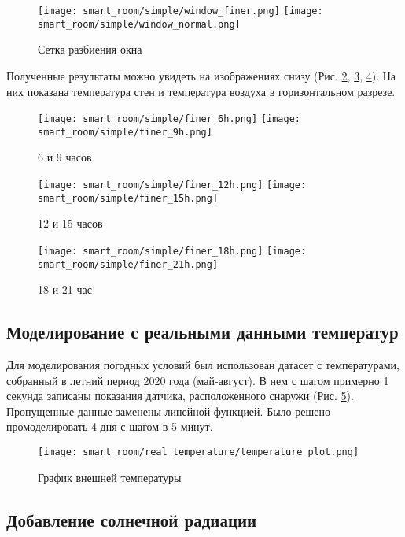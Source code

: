\begin{figure}[H]
\texttt{[image: smart\_room/simple/window\_finer.png]}\hfill
\texttt{[image: smart\_room/simple/window\_normal.png]}
\caption{Сетка разбиения окна}
\label{window}
\end{figure}


Полученные результаты можно увидеть на изображениях снизу (Рис. \ref{6-9}, \ref{12-15}, \ref{18-21}). На них показана температура стен и температура воздуха в горизонтальном разрезе.

\begin{figure}[H]
\texttt{[image: smart\_room/simple/finer\_6h.png]}\hfill
\texttt{[image: smart\_room/simple/finer\_9h.png]}
\caption{6 и 9 часов}
\label{6-9}
\end{figure}

\begin{figure}[H]
\texttt{[image: smart\_room/simple/finer\_12h.png]}\hfill
\texttt{[image: smart\_room/simple/finer\_15h.png]}
\caption{12 и 15 часов}
\label{12-15}
\end{figure}

\begin{figure}[H]
\texttt{[image: smart\_room/simple/finer\_18h.png]}\hfill
\texttt{[image: smart\_room/simple/finer\_21h.png]}
\caption{18 и 21 час}
\label{18-21}
\end{figure}
\newpage


\subsection{Моделирование с реальными данными температур}

Для моделирования погодных условий был использован датасет с температурами, собранный в летний период 2020 года (май-август). В нем с шагом примерно 1 секунда записаны показания датчика, расположенного снаружи (Рис. \ref{real-temperature-plot}). Пропущенные данные заменены линейной функцией. Было решено промоделировать 4 дня с шагом в 5 минут. 

\begin{figure}[H]
\texttt{[image: smart\_room/real\_temperature/temperature\_plot.png]}
\caption{График внешней температуры}
\label{real-temperature-plot}
\end{figure}

\newpage


\subsection{Добавление солнечной радиации}

